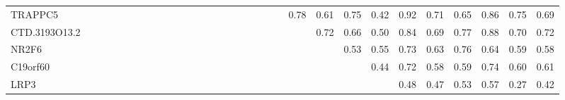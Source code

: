 \begin{longtable}{lrrrrrrrrrrrrrrrrrrrrrrrrrrrrrr}
TRAPPC5       &                    &               &            &             &              &               &               &               &             &               &              &             &              &             &             &             &                &                &               &               &                0.78 &        0.61 &           0.75 &       0.42 &          0.92 &         0.71 &       0.65 &         0.86 &           0.75 &          0.69 \\
CTD.3193O13.2 &                    &               &            &             &              &               &               &               &             &               &              &             &              &             &             &             &                &                &               &               &                     &        0.72 &           0.66 &       0.50 &          0.84 &         0.69 &       0.77 &         0.88 &           0.70 &          0.72 \\
NR2F6         &                    &               &            &             &              &               &               &               &             &               &              &             &              &             &             &             &                &                &               &               &                     &             &           0.53 &       0.55 &          0.73 &         0.63 &       0.76 &         0.64 &           0.59 &          0.58 \\
C19orf60      &                    &               &            &             &              &               &               &               &             &               &              &             &              &             &             &             &                &                &               &               &                     &             &                &       0.44 &          0.72 &         0.58 &       0.59 &         0.74 &           0.60 &          0.61 \\
LRP3          &                    &               &            &             &              &               &               &               &             &               &              &             &              &             &             &             &                &                &               &               &                     &             &                &            &          0.48 &         0.47 &       0.53 &         0.57 &           0.27 &          0.42 \\

\end{longtable}
